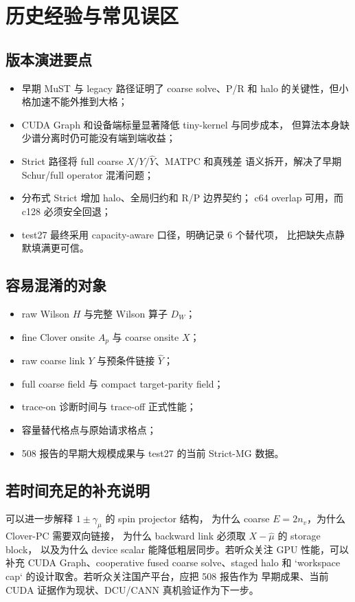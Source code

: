 \documentclass[UTF8,a4paper,11pt,fontset=none]{ctexart}
\begin{document}
\section{历史经验与常见误区}

\subsection{版本演进要点}

\begin{itemize}
  \item 早期 MuST 与 legacy 路径证明了 coarse solve、P/R 和 halo
        的关键性，但小格加速不能外推到大格；
  \item CUDA Graph 和设备端标量显著降低 tiny-kernel 与同步成本，
        但算法本身缺少谱分离时仍可能没有端到端收益；
  \item Strict 路径将 full coarse \(X/Y/\widehat Y\)、MATPC 和真残差
        语义拆开，解决了早期 Schur/full operator 混淆问题；
  \item 分布式 Strict 增加 halo、全局归约和 R/P 边界契约；
        c64 overlap 可用，而 c128 必须安全回退；
  \item test27 最终采用 capacity-aware 口径，明确记录 6 个替代项，
        比把缺失点静默填满更可信。
\end{itemize}

\subsection{容易混淆的对象}

\begin{itemize}
  \item raw Wilson \(H\) 与完整 Wilson 算子 \(D_W\)；
  \item fine Clover onsite \(A_p\) 与 coarse onsite \(X\)；
  \item raw coarse link \(Y\) 与预条件链接 \(\widehat Y\)；
  \item full coarse field 与 compact target-parity field；
  \item trace-on 诊断时间与 trace-off 正式性能；
  \item 容量替代格点与原始请求格点；
  \item 508 报告的早期大规模成果与 test27 的当前 Strict-MG 数据。
\end{itemize}

\subsection{若时间充足的补充说明}

可以进一步解释 \(1\pm\gamma_\mu\) 的 spin projector 结构，
为什么 coarse \(E=2n_v\)，为什么 Clover-PC 需要双向链接，
为什么 backward link 必须取 \(X-\hat\mu\) 的 storage block，
以及为什么 device scalar 能降低粗层同步。若听众关注 GPU 性能，可以
补充 CUDA Graph、cooperative fused coarse solve、staged halo 和
`workspace cap` 的设计取舍。若听众关注国产平台，应把 508 报告作为
早期成果、当前 CUDA 证据作为现状、DCU/CANN 真机验证作为下一步。
\end{document}
